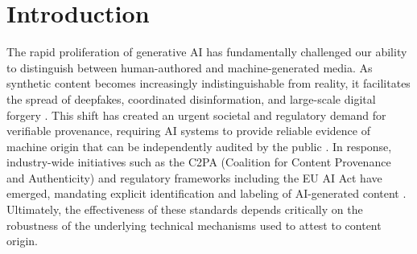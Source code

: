 \documentclass{article}
\theoremstyle{plain}
\theoremstyle{definition}
\theoremstyle{remark}
\begin{document}
\printAffiliationsAndNotice{}  %

\begin{abstract} 
Generative AI models now produce images that are difficult to distinguish from real data, making publicly verifiable provenance essential; however, existing invisible and semantic watermarking methods become vulnerable to black-box imprint forgeries and adaptive optimization attacks once their detectors are made public. We propose PP-Mark, a provenance framework that achieves unforgeability and public verifiability by binding statistical watermark detection to cryptographic commitments. PP-Mark enforces consistency between the generation context and image-specific latent traces using zero-knowledge proofs, thereby preventing adversarial optimization against the detector, and ensuring that forged content fails verification by construction. Experimental results show that PP-Mark is robust to advanced forgery attacks while remaining computationally efficient for decentralized verification.
\end{abstract}


\section{Introduction}
The rapid proliferation of generative AI has fundamentally challenged our ability to distinguish between human-authored and machine-generated media. As synthetic content becomes increasingly indistinguishable from reality, it facilitates the spread of deepfakes, coordinated disinformation, and large-scale digital forgery \cite{chesney_citron2019}. This shift has created an urgent societal and regulatory demand for verifiable provenance, requiring AI systems to provide reliable evidence of machine origin that can be independently audited by the public \cite{longpre2024dataauth}. In response, industry-wide initiatives such as the C2PA (Coalition for Content Provenance and Authenticity) and regulatory frameworks including the EU AI Act have emerged, mandating explicit identification and labeling of AI-generated content \cite{c2pa_spec_2_3}. Ultimately, the effectiveness of these standards depends critically on the robustness of the underlying technical mechanisms used to attest to content origin.
\end{document}
